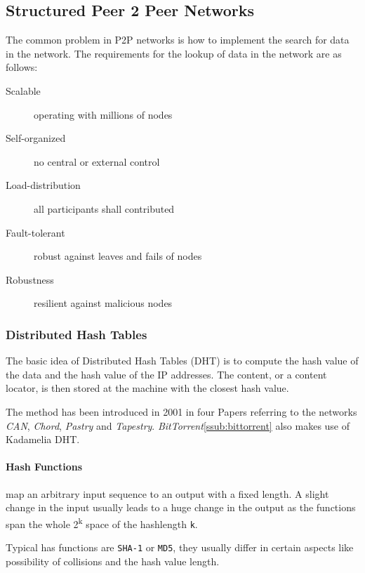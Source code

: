 \subsection{Structured Peer 2 Peer Networks} %
\label{sub:structured_peer_2_peer_networks}
The common problem in P2P networks is how to implement the search for data in the network.
The requirements for the lookup of data in the network are as follows:
\begin{description}
	\item[Scalable] operating with millions of nodes
	\item[Self-organized] no central or external control
	\item[Load-distribution] all participants shall contributed
	\item[Fault-tolerant] robust against leaves and fails of nodes
	\item[Robustness] resilient against malicious nodes 
\end{description}


\subsubsection{Distributed Hash Tables} %
\label{ssub:distributed_hash_tables}
The basic idea of Distributed Hash Tables (DHT) is to compute the hash value of the data
and the hash value of the IP addresses.
The content, or a content locator,
is then stored at the machine with the closest hash value.

The method has been introduced in 2001 in four Papers referring to the networks
\emph{CAN},  \emph{Chord}, \emph{Pastry} and \emph{Tapestry}.
\emph{BitTorrent}\ref{ssub:bittorrent} also makes use of Kadamelia DHT.

	\paragraph{Hash Functions} %
	\label{par:hash_functions}
	map an arbitrary input sequence to an output with a fixed length.
	A slight change in the input usually leads to a huge change in the output
	as the functions span the whole 2\textsuperscript{k} space of the hashlength \texttt{k}. 

	Typical has functions are \texttt{SHA-1} or \texttt{MD5},
	they usually differ in certain aspects like possibility of collisions and the hash value length.

